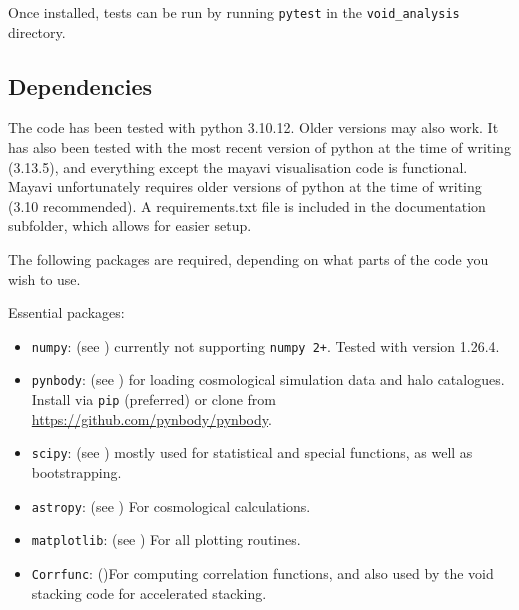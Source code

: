 \documentclass{article}
\newcommand{\codefont}[1]{{\texttt{#1}}}
\begin{document}
	Once installed, tests can be run by running \codefont{pytest} in the \codefont{void\_analysis} directory. 
	
	\subsection{Dependencies}
	
	The code has been tested with python 3.10.12. Older versions may also work. It has also been tested with the most recent version of python at the time of writing (3.13.5), and everything except the mayavi visualisation code is functional. Mayavi unfortunately requires older versions of python at the time of writing (3.10 recommended). A requirements.txt file is included in the documentation subfolder, which allows for easier setup.
	
	The following packages are required, depending on what parts of the code you wish to use.
	
	Essential packages:
	
	\begin{itemize}
		\item \codefont{numpy}: (see \citet{harris2020array}) currently not supporting \codefont{numpy 2+}. Tested with version 1.26.4.
		\item \codefont{pynbody}: (see \citet{pynbody}) for loading cosmological simulation data and halo catalogues. Install via \codefont{pip} (preferred) or clone from \url{https://github.com/pynbody/pynbody}.
		\item \codefont{scipy}: (see \citet{2020SciPy-NMeth}) mostly used for statistical and special functions, as well as bootstrapping.
		\item \codefont{astropy}: (see \citet{astropy:2013,astropy:2018,astropy:2022}) For cosmological calculations.
		\item \codefont{matplotlib}: (see \citet{Hunter:2007}) For all plotting routines.
		\item \codefont{Corrfunc}: (\citet{2020MNRAS.491.3022S})For computing correlation functions, and also used by the void stacking code for accelerated stacking.
	\end{itemize}
	
\end{document}
